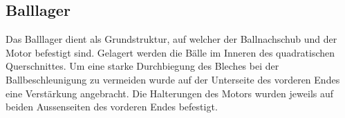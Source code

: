 \subsection{Balllager}
Das Balllager dient als Grundstruktur, auf welcher der Ballnachschub und der 
Motor befestigt sind. Gelagert werden die Bälle im Inneren des quadratischen 
Querschnittes. Um eine starke Durchbiegung des Bleches bei der 
Ballbeschleunigung zu vermeiden wurde auf der Unterseite des vorderen Endes 
eine Verstärkung angebracht. Die Halterungen des Motors wurden jeweils auf 
beiden Aussenseiten des vorderen Endes befestigt.
